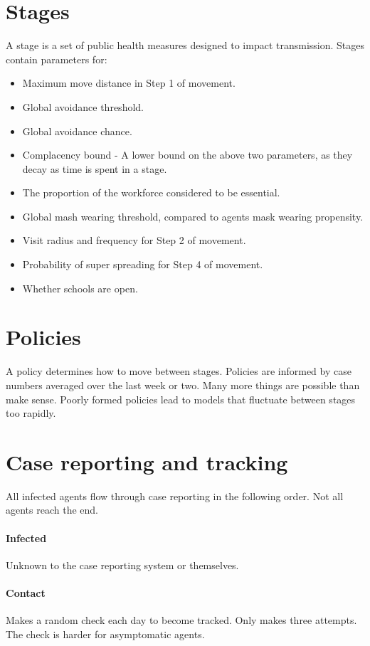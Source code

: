 \documentclass[]{article}
\begin{document}
\section{Stages}
A stage is a set of public health measures designed to impact transmission. Stages contain parameters for:
\begin{itemize}
	\item Maximum move distance in Step 1 of movement.
	\item Global avoidance threshold.
	\item Global avoidance chance.
	\item Complacency bound - A lower bound on the above two parameters, as they decay as time is spent in a stage.
	\item The proportion of the workforce considered to be essential.
	\item Global mash wearing threshold, compared to agents mask wearing propensity.
	\item Visit radius and frequency for Step 2 of movement.
	\item Probability of super spreading for Step 4 of movement.
	\item Whether schools are open.
\end{itemize}

\section{Policies}
A policy determines how to move between stages. Policies are informed by case numbers averaged over the last week or two. Many more things are possible than make sense. Poorly formed policies lead to models that fluctuate between stages too rapidly.

\section{Case reporting and tracking}
All infected agents flow through case reporting in the following order. Not all agents reach the end.

\paragraph{Infected}  Unknown to the case reporting system or themselves.

\paragraph{Contact} Makes a random check each day to become tracked. Only makes three attempts. The check is harder for asymptomatic agents.
\end{document}
